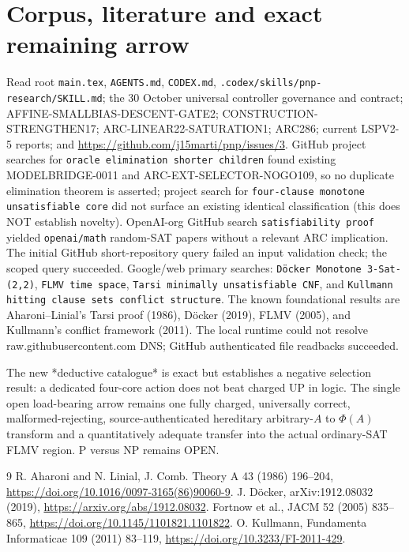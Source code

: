 \documentclass[11pt]{article}
\begin{document}
\section{Corpus, literature and exact remaining arrow}
Read root \texttt{main.tex}, \texttt{AGENTS.md}, \texttt{CODEX.md}, \texttt{.codex/skills/pnp-research/SKILL.md}; the 30 October universal controller governance and contract; AFFINE-SMALLBIAS-DESCENT-GATE2; CONSTRUCTION-STRENGTHEN17; ARC-LINEAR22-SATURATION1; ARC286; current LSPV2-5 reports; and \url{https://github.com/j15marti/pnp/issues/3}. GitHub project searches for \texttt{oracle elimination shorter children} found existing MODELBRIDGE-0011 and ARC-EXT-SELECTOR-NOGO109, so no duplicate elimination theorem is asserted; project search for \texttt{four-clause monotone unsatisfiable core} did not surface an existing identical classification (this does NOT establish novelty). OpenAI-org GitHub search \texttt{satisfiability proof} yielded \texttt{openai/math} random-SAT papers without a relevant ARC implication. The initial GitHub short-repository query failed an input validation check; the scoped query succeeded. Google/web primary searches: \texttt{D\"ocker Monotone 3-Sat-(2,2)}, \texttt{FLMV time space}, \texttt{Tarsi minimally unsatisfiable CNF}, and \texttt{Kullmann hitting clause sets conflict structure}. The known foundational results are Aharoni--Linial's Tarsi proof (1986), D\"ocker (2019), FLMV (2005), and Kullmann's conflict framework (2011). The local runtime could not resolve raw.githubusercontent.com DNS; GitHub authenticated file readbacks succeeded.

The new *deductive catalogue* is exact but establishes a negative selection result: a dedicated four-core action does not beat charged UP in logic. The single open load-bearing arrow remains one fully charged, universally correct, malformed-rejecting, source-authenticated hereditary arbitrary-$A$ to $\Phi(A)$ transform and a quantitatively adequate transfer into the actual ordinary-SAT FLMV region. P versus NP remains OPEN.

\begin{thebibliography}{9}
 R. Aharoni and N. Linial, J. Comb. Theory A 43 (1986) 196--204, \url{https://doi.org/10.1016/0097-3165(86)90060-9}.
 J. D\"ocker, arXiv:1912.08032 (2019), \url{https://arxiv.org/abs/1912.08032}.
 Fortnow et al., JACM 52 (2005) 835--865, \url{https://doi.org/10.1145/1101821.1101822}.
 O. Kullmann, Fundamenta Informaticae 109 (2011) 83--119, \url{https://doi.org/10.3233/FI-2011-429}.
\end{thebibliography}
\end{document}
